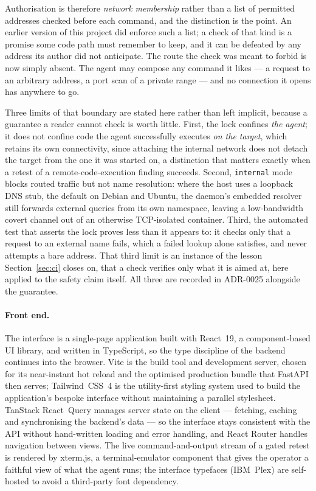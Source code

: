Authorisation is therefore \emph{network membership} rather than a list of
permitted addresses checked before each command, and the distinction is the point.
An earlier version of this project did enforce such a list; a check of that kind is
a promise some code path must remember to keep, and it can be defeated by any
address its author did not anticipate. The route the check was meant to forbid is
now simply absent. The agent may compose any command it likes --- a request to an
arbitrary address, a port scan of a private range --- and no connection it
opens has anywhere to go.

Three limits of that boundary are stated here rather than left implicit, because a
guarantee a reader cannot check is worth little. First, the lock confines \emph{the
agent}; it does not confine code the agent successfully executes \emph{on the
target}, which retains its own connectivity, since attaching the internal network
does not detach the target from the one it was started on, a distinction that
matters exactly when a retest of a remote-code-execution finding succeeds. Second,
\texttt{internal} mode blocks routed traffic but not name resolution: where the host
uses a loopback DNS stub, the default on Debian and Ubuntu, the daemon's
embedded resolver still forwards external queries from its own namespace, leaving a
low-bandwidth covert channel out of an otherwise TCP-isolated container. Third, the
automated test that asserts the lock proves less than it appears to: it checks only
that a request to an external name fails, which a failed lookup alone satisfies, and
never attempts a bare address. That third limit is an instance of the lesson
Section~\ref{sec:ci} closes on, that a check verifies only what it is aimed at, here
applied to the safety claim itself. All three are recorded in ADR-0025 alongside the
guarantee.

\paragraph{Front end.} The interface is a single-page application built with
React~19, a component-based UI library, and written in TypeScript, so the type
discipline of the backend continues into the browser. Vite is the build tool and
development server, chosen for its near-instant hot reload and the optimised
production bundle that FastAPI then serves; Tailwind~CSS~4 is the utility-first
styling system used to build the application's bespoke interface without maintaining
a parallel stylesheet. TanStack React~Query manages server state on the client ---
fetching, caching and synchronising the backend's data --- so the interface stays
consistent with the API without hand-written loading and error handling, and React
Router handles navigation between views. The live command-and-output stream of a
gated retest is rendered by xterm.js, a terminal-emulator component that gives the
operator a faithful view of what the agent runs; the interface typefaces (IBM~Plex)
are self-hosted to avoid a third-party font dependency.

